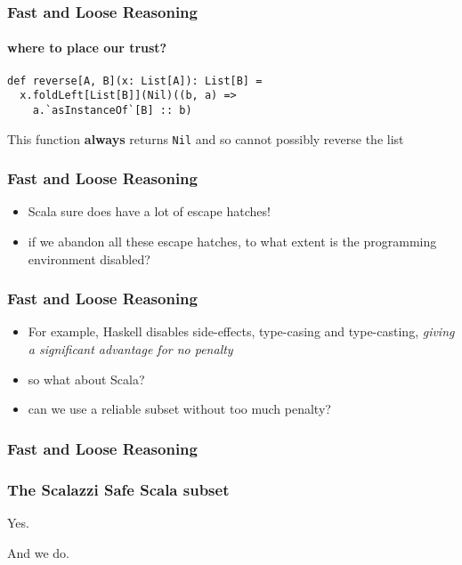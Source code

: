 \begin{frame}[fragile]
\frametitle{Fast and Loose Reasoning}
\framesubtitle{where to place our trust?}
\begin{lstlisting}[style=scala]
def reverse[A, B](x: List[A]): List[B] = 
  x.foldLeft[List[B]](Nil)((b, a) =>
    a.`asInstanceOf`[B] :: b)
\end{lstlisting}
\begin{theorem}This function \textbf{always} returns \lstinline{Nil} and so cannot possibly reverse the list\end{theorem}
\end{frame}

\begin{frame}[fragile]
\frametitle{Fast and Loose Reasoning}
\begin{itemize}
  \item Scala sure does have a lot of escape hatches!
  \item if we abandon all these escape hatches, to what extent is the programming environment disabled?
\end{itemize}
\end{frame}

\begin{frame}[fragile]
\frametitle{Fast and Loose Reasoning}
\begin{itemize}
  \item For example, Haskell disables side-effects, type-casing and type-casting, \emph{giving a significant advantage for no penalty}
  \item so what about Scala?
  \item can we use a reliable subset without too much penalty?
\end{itemize}
\end{frame}

\begin{frame}[fragile]
\frametitle{Fast and Loose Reasoning}
\frametitle{The Scalazzi Safe Scala subset}
\begin{center}
Yes.
\end{center}
\begin{center}
And we do.
\end{center}
\end{frame}

